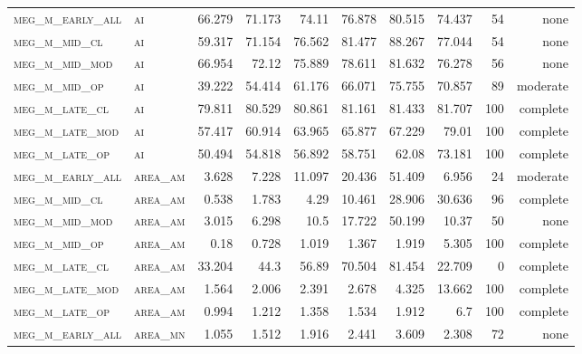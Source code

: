 \begin{landscape}
\begin{center}
\begin{footnotesize}
\begin{longtable}{llrrrrr|rrr}
\textsc{meg\_m\_early\_all} & \textsc{ai        }   & 66.279   & 71.173   & 74.11    & 76.878   & 80.515   & 74.437   & 54  & none     \\
\textsc{meg\_m\_mid\_cl   } & \textsc{ai        }   & 59.317   & 71.154   & 76.562   & 81.477   & 88.267   & 77.044   & 54  & none     \\
\textsc{meg\_m\_mid\_mod  } & \textsc{ai        }   & 66.954   & 72.12    & 75.889   & 78.611   & 81.632   & 76.278   & 56  & none     \\
\textsc{meg\_m\_mid\_op   } & \textsc{ai        }   & 39.222   & 54.414   & 61.176   & 66.071   & 75.755   & 70.857   & 89  & moderate \\
\textsc{meg\_m\_late\_cl  } & \textsc{ai        }   & 79.811   & 80.529   & 80.861   & 81.161   & 81.433   & 81.707   & 100 & complete \\
\textsc{meg\_m\_late\_mod } & \textsc{ai        }   & 57.417   & 60.914   & 63.965   & 65.877   & 67.229   & 79.01    & 100 & complete \\
\textsc{meg\_m\_late\_op  } & \textsc{ai        }   & 50.494   & 54.818   & 56.892   & 58.751   & 62.08    & 73.181   & 100 & complete \\
\textsc{meg\_m\_early\_all} & \textsc{area\_am  }   & 3.628    & 7.228    & 11.097   & 20.436   & 51.409   & 6.956    & 24  & moderate \\
\textsc{meg\_m\_mid\_cl   } & \textsc{area\_am  }   & 0.538    & 1.783    & 4.29     & 10.461   & 28.906   & 30.636   & 96  & complete \\
\textsc{meg\_m\_mid\_mod  } & \textsc{area\_am  }   & 3.015    & 6.298    & 10.5     & 17.722   & 50.199   & 10.37    & 50  & none     \\
\textsc{meg\_m\_mid\_op   } & \textsc{area\_am  }   & 0.18     & 0.728    & 1.019    & 1.367    & 1.919    & 5.305    & 100 & complete \\
\textsc{meg\_m\_late\_cl  } & \textsc{area\_am  }   & 33.204   & 44.3     & 56.89    & 70.504   & 81.454   & 22.709   & 0   & complete \\
\textsc{meg\_m\_late\_mod } & \textsc{area\_am  }   & 1.564    & 2.006    & 2.391    & 2.678    & 4.325    & 13.662   & 100 & complete \\
\textsc{meg\_m\_late\_op  } & \textsc{area\_am  }   & 0.994    & 1.212    & 1.358    & 1.534    & 1.912    & 6.7      & 100 & complete \\
\textsc{meg\_m\_early\_all} & \textsc{area\_mn  }   & 1.055    & 1.512    & 1.916    & 2.441    & 3.609    & 2.308    & 72  & none     \\

\end{longtable}
\end{footnotesize}
\end{center}
\end{landscape}
